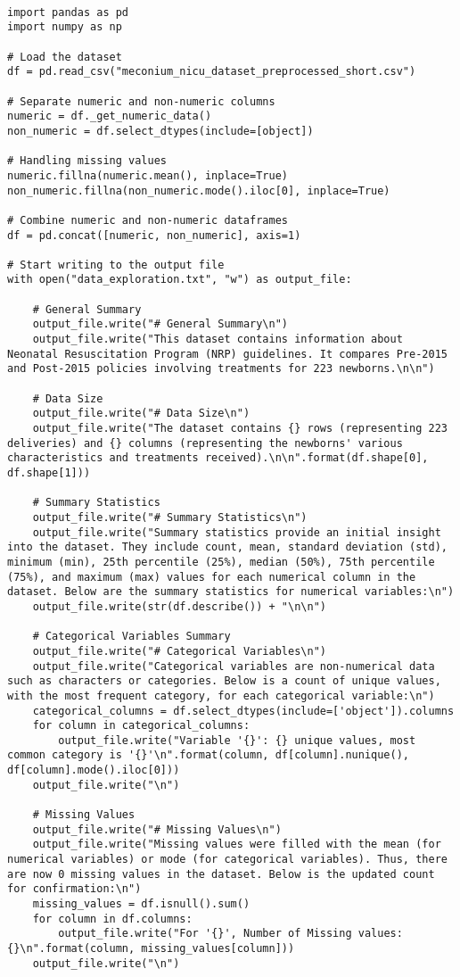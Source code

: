 \documentclass[11pt]{article}
\begin{document}
\begin{verbatim}

import pandas as pd
import numpy as np

# Load the dataset
df = pd.read_csv("meconium_nicu_dataset_preprocessed_short.csv")

# Separate numeric and non-numeric columns
numeric = df._get_numeric_data()
non_numeric = df.select_dtypes(include=[object])

# Handling missing values
numeric.fillna(numeric.mean(), inplace=True)
non_numeric.fillna(non_numeric.mode().iloc[0], inplace=True)

# Combine numeric and non-numeric dataframes
df = pd.concat([numeric, non_numeric], axis=1)

# Start writing to the output file
with open("data_exploration.txt", "w") as output_file:
    
    # General Summary
    output_file.write("# General Summary\n")
    output_file.write("This dataset contains information about Neonatal Resuscitation Program (NRP) guidelines. It compares Pre-2015 and Post-2015 policies involving treatments for 223 newborns.\n\n")
    
    # Data Size
    output_file.write("# Data Size\n")
    output_file.write("The dataset contains {} rows (representing 223 deliveries) and {} columns (representing the newborns' various characteristics and treatments received).\n\n".format(df.shape[0], df.shape[1]))
    
    # Summary Statistics
    output_file.write("# Summary Statistics\n")
    output_file.write("Summary statistics provide an initial insight into the dataset. They include count, mean, standard deviation (std), minimum (min), 25th percentile (25%), median (50%), 75th percentile (75%), and maximum (max) values for each numerical column in the dataset. Below are the summary statistics for numerical variables:\n")
    output_file.write(str(df.describe()) + "\n\n")
    
    # Categorical Variables Summary
    output_file.write("# Categorical Variables\n")
    output_file.write("Categorical variables are non-numerical data such as characters or categories. Below is a count of unique values, with the most frequent category, for each categorical variable:\n")
    categorical_columns = df.select_dtypes(include=['object']).columns
    for column in categorical_columns:
        output_file.write("Variable '{}': {} unique values, most common category is '{}'\n".format(column, df[column].nunique(), df[column].mode().iloc[0]))
    output_file.write("\n")
    
    # Missing Values
    output_file.write("# Missing Values\n")
    output_file.write("Missing values were filled with the mean (for numerical variables) or mode (for categorical variables). Thus, there are now 0 missing values in the dataset. Below is the updated count for confirmation:\n")
    missing_values = df.isnull().sum()
    for column in df.columns:
        output_file.write("For '{}', Number of Missing values: {}\n".format(column, missing_values[column]))
    output_file.write("\n")

\end{verbatim}
\end{document}
